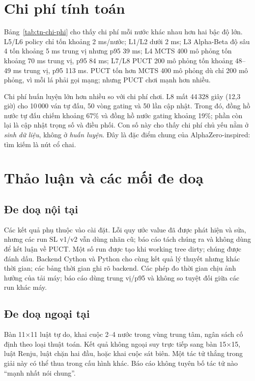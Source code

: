\section{Chi phí tính toán}
\label{sec:tn-chi-phi}
\begin{table}[H]
  \centering\small
  \caption{Chi phí mỗi nước trong RR8, đo bên ngoài lời gọi tác tử. Cột cuối là trung bình số
  mô phỏng (PUCT/MCTS) hoặc số nút (Alpha-Beta) mỗi nước.}
  \label{tab:tn-chi-phi}
  
\end{table}
Bảng~\ref{tab:tn-chi-phi} cho thấy chi phí mỗi nước khác nhau hơn hai bậc độ lớn. L5/L6 policy
chỉ tốn khoảng 2 ms/nước; L1/L2 dưới 2 ms; L3 Alpha-Beta độ sâu 4 tốn khoảng 5 ms trung vị
nhưng p95 39 ms; L4 MCTS 400 mô phỏng tốn khoảng 70 ms trung vị, p95 84 ms; L7/L8 PUCT 200 mô
phỏng tốn khoảng 48--49 ms trung vị, p95 113 ms. PUCT tốn hơn MCTS 400 mô phỏng dù chỉ 200 mô
phỏng, vì mỗi lá phải gọi mạng; nhưng PUCT chơi mạnh hơn nhiều.

Chi phí huấn luyện lớn hơn nhiều so với chi phí chơi. L8 mất 44\,328 giây (12,3 giờ) cho 10\,000
ván tự đấu, 50 vòng gating và 50 lần cập nhật. Trong đó, đồng hồ nước tự đấu chiếm khoảng 67\%
và đồng hồ nước gating khoảng 19\%; phần còn lại là cập nhật trọng số và điều phối. Con số này
cho thấy chi phí chủ yếu nằm ở \emph{sinh dữ liệu}, không ở \emph{huấn luyện}. Đây là đặc điểm
chung của AlphaZero-inspired: tìm kiếm là nút cổ chai.

\section{Thảo luận và các mối đe doạ}
\label{sec:tn-han-che}
\subsection{Đe doạ nội tại}
Các kết quả phụ thuộc vào cài đặt. Lỗi quy ước value đã được phát hiện và sửa, nhưng các run
SL v1/v2 vẫn dùng nhãn cũ; báo cáo tách chúng ra và không dùng để kết luận về PUCT. Một số run
được tạo khi working tree dirty; chúng được đánh dấu. Backend Cython và Python cho cùng kết quả
lý thuyết nhưng khác thời gian; các bảng thời gian ghi rõ backend. Các phép đo thời gian chịu
ảnh hưởng của tải máy; báo cáo dùng trung vị/p95 và không so tuyệt đối giữa các run khác máy.

\subsection{Đe doạ ngoại tại}
Bàn 11×11 luật tự do, khai cuộc 2--4 nước trong vùng trung tâm, ngân sách cố định theo loại
thuật toán. Kết quả không ngoại suy trực tiếp sang bàn 15×15, luật Renju, luật chặn hai đầu,
hoặc khai cuộc sát biên. Một tác tử thắng trong giải này có thể thua trong cấu hình khác. Báo
cáo không tuyên bố tác tử nào ``mạnh nhất nói chung''.

